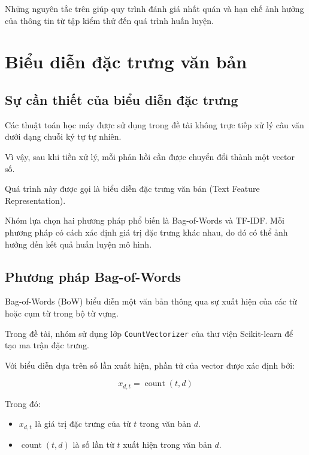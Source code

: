 Những nguyên tắc trên giúp quy trình đánh giá nhất quán và hạn chế ảnh hưởng của thông tin từ tập kiểm thử đến quá trình huấn luyện.



\section{Biểu diễn đặc trưng văn bản}

\subsection{Sự cần thiết của biểu diễn đặc trưng}

Các thuật toán học máy được sử dụng trong đề tài không trực tiếp xử lý câu văn dưới dạng chuỗi ký tự tự nhiên.

Vì vậy, sau khi tiền xử lý, mỗi phản hồi cần được chuyển đổi thành một vector số.

Quá trình này được gọi là biểu diễn đặc trưng văn bản (Text Feature Representation).

Nhóm lựa chọn hai phương pháp phổ biến là Bag-of-Words và TF-IDF. Mỗi phương pháp có cách xác định giá trị đặc trưng khác nhau, do đó có thể ảnh hưởng đến kết quả huấn luyện mô hình.


\subsection{Phương pháp Bag-of-Words}

Bag-of-Words (BoW) biểu diễn một văn bản thông qua sự xuất hiện của các từ hoặc cụm từ trong bộ từ vựng.

Trong đề tài, nhóm sử dụng lớp \texttt{CountVectorizer} của thư viện Scikit-learn để tạo ma trận đặc trưng.

Với biểu diễn dựa trên số lần xuất hiện, phần tử của vector được xác định bởi:

\begin{equation}
x_{d,t} = \operatorname{count}(t,d)
\end{equation}

Trong đó:

\begin{itemize}
    \item $x_{d,t}$ là giá trị đặc trưng của từ $t$ trong văn bản $d$.

    \item $\operatorname{count}(t,d)$ là số lần từ $t$ xuất hiện trong văn bản $d$.
\end{itemize}

